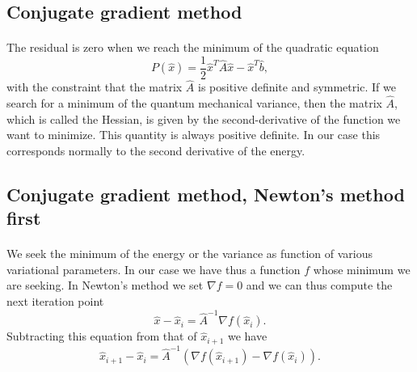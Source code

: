 \documentclass[%
twoside,                 %
final,                   %
10pt]{article}
\begin{document}
\subsection*{Conjugate gradient method}

\paragraph{}

The residual is zero when we reach the minimum of the quadratic equation
\begin{equation*}
  P(\hat{x})=\frac{1}{2}\hat{x}^T\hat{A}\hat{x} - \hat{x}^T\hat{b},
\end{equation*}
with the constraint that the matrix $\hat{A}$ is positive definite and symmetric.
If we search for a minimum of the quantum mechanical  variance, then the matrix 
$\hat{A}$, which is called the Hessian, is given by the second-derivative of the function we want to minimize.  This quantity is always positive definite.  In our case this corresponds normally to the second derivative of the energy.







\subsection*{Conjugate gradient method, Newton's method first}

\paragraph{}
We seek the minimum of the energy or the variance as function of various variational parameters. 
In our case we have thus a function $f$ whose minimum we are seeking.
In Newton's method we set $\nabla f = 0$ and we can thus compute the next iteration point
\begin{equation*}
\hat{x}-\hat{x}_i=\hat{A}^{-1}\nabla f(\hat{x}_i).
\end{equation*}
Subtracting this equation from that of $\hat{x}_{i+1}$ we have
\begin{equation*}
\hat{x}_{i+1}-\hat{x}_i=\hat{A}^{-1}(\nabla f(\hat{x}_{i+1})-\nabla f(\hat{x}_i)).
\end{equation*}
\end{document}
